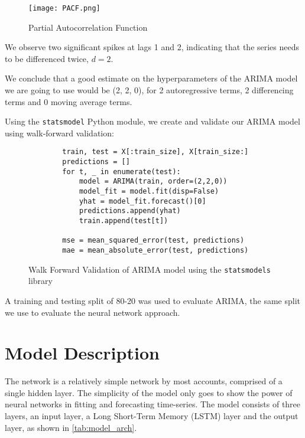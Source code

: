 \begin{figure}[H]
    \centering
    \texttt{[image: PACF.png]}
    \caption{Partial Autocorrelation Function}
    \label{tab:PACF}
\end{figure}

We observe two significant spikes at lags 1 and 2, indicating that the series needs to be differenced twice, $d = 2$.

We conclude that a good estimate on the hyperparameters of the ARIMA model we are going to use would be (2, 2, 0), for 2 autoregressive terms, 2 differencing terms and 0 moving average terms.

Using the \texttt{statsmodel} Python module, we create and validate our ARIMA model using walk-forward validation:

\begin{figure}[H]
    \begin{verbatim}
        train, test = X[:train_size], X[train_size:]
        predictions = []
        for t, _ in enumerate(test):
            model = ARIMA(train, order=(2,2,0))
            model_fit = model.fit(disp=False)
            yhat = model_fit.forecast()[0]
            predictions.append(yhat)
            train.append(test[t])

        mse = mean_squared_error(test, predictions)
        mae = mean_absolute_error(test, predictions)
    \end{verbatim}
    \caption{Walk Forward Validation of ARIMA model using the \texttt{statsmodels} library}
    \label{code:arima}
\end{figure}

A training and testing split of 80-20 was used to evaluate ARIMA, the same split we use to evaluate the neural network approach.

\section{Model Description}
The network is a relatively simple network by most accounts, comprised of a single hidden layer. The simplicity of the model only goes to show the power of neural networks in fitting and forecasting time-series. The model consists of three layers, an input layer, a Long Short-Term Memory (LSTM) layer and the output layer, as shown in \ref{tab:model_arch}.

